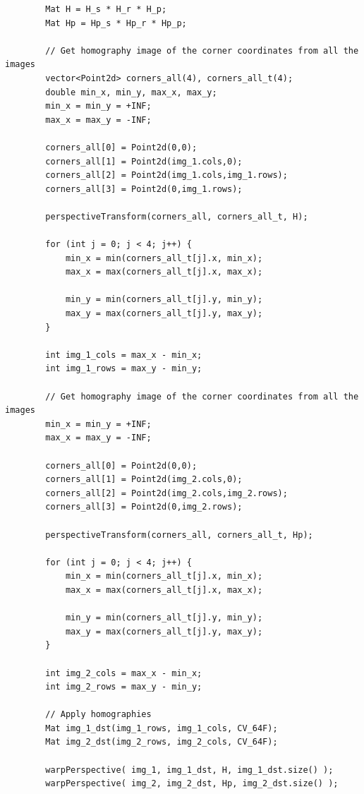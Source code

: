 \documentclass[a4paper, 11pt]{article}
\theoremstyle{definition}
\begin{document}
    \begin{lstlisting}
        Mat H = H_s * H_r * H_p;
        Mat Hp = Hp_s * Hp_r * Hp_p;

        // Get homography image of the corner coordinates from all the images
        vector<Point2d> corners_all(4), corners_all_t(4);
        double min_x, min_y, max_x, max_y;
        min_x = min_y = +INF;
        max_x = max_y = -INF;

        corners_all[0] = Point2d(0,0);
        corners_all[1] = Point2d(img_1.cols,0);
        corners_all[2] = Point2d(img_1.cols,img_1.rows);
        corners_all[3] = Point2d(0,img_1.rows);

        perspectiveTransform(corners_all, corners_all_t, H);

        for (int j = 0; j < 4; j++) {
            min_x = min(corners_all_t[j].x, min_x);
            max_x = max(corners_all_t[j].x, max_x);

            min_y = min(corners_all_t[j].y, min_y);
            max_y = max(corners_all_t[j].y, max_y);
        }

        int img_1_cols = max_x - min_x;
        int img_1_rows = max_y - min_y;

        // Get homography image of the corner coordinates from all the images
        min_x = min_y = +INF;
        max_x = max_y = -INF;

        corners_all[0] = Point2d(0,0);
        corners_all[1] = Point2d(img_2.cols,0);
        corners_all[2] = Point2d(img_2.cols,img_2.rows);
        corners_all[3] = Point2d(0,img_2.rows);

        perspectiveTransform(corners_all, corners_all_t, Hp);

        for (int j = 0; j < 4; j++) {
            min_x = min(corners_all_t[j].x, min_x);
            max_x = max(corners_all_t[j].x, max_x);

            min_y = min(corners_all_t[j].y, min_y);
            max_y = max(corners_all_t[j].y, max_y);
        }

        int img_2_cols = max_x - min_x;
        int img_2_rows = max_y - min_y;

        // Apply homographies
        Mat img_1_dst(img_1_rows, img_1_cols, CV_64F);
        Mat img_2_dst(img_2_rows, img_2_cols, CV_64F);

        warpPerspective( img_1, img_1_dst, H, img_1_dst.size() );
        warpPerspective( img_2, img_2_dst, Hp, img_2_dst.size() );
    \end{lstlisting}
\end{document}
